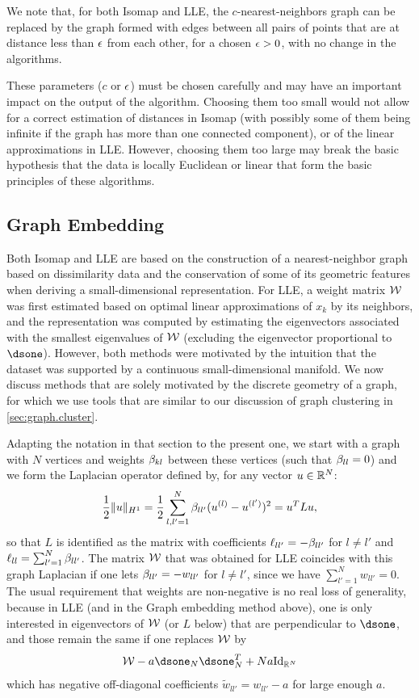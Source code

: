 \begin{remark}
We note that, for both Isomap and LLE, the $c$-nearest-neighbors graph can be replaced by the graph formed with edges between all pairs of points that are at distance less than $\epsilon$ from each other, for a chosen $\epsilon>0$, with no change in the algorithms.

These parameters ($c$ or $\epsilon$) must be chosen carefully and may have an important impact on the output of the algorithm. Choosing them too small would not allow for a correct estimation of distances in Isomap (with possibly some of them being infinite if the graph has more than one connected component), or of the linear approximations in LLE. However, choosing them too large
may break the basic hypothesis that the data is locally Euclidean or linear that form the basic principles of these algorithms.
\end{remark}


\subsection{Graph Embedding}

Both Isomap and LLE  are based on the construction of a nearest-neighbor graph based on dissimilarity data and the conservation of some of its geometric features when deriving a small-dimensional representation. For LLE, a weight matrix ${\mathcal W}$ was first estimated based on optimal linear approximations of $x_k$ by its neighbors, and the representation was computed by estimating the eigenvectors associated with the smallest eigenvalues of ${\mathcal W}$ (excluding the eigenvector proportional to $\dsone$). However, both methods were motivated by the intuition that the dataset was supported by a continuous small-dimensional manifold.
We now discuss methods that are solely motivated by the discrete geometry of a graph, for which we use tools that are similar to our discussion of graph clustering in \cref{sec:graph.cluster}. 

Adapting the notation in that section to the present one, we start with a graph with $N$ vertices and weights $\beta_{kl}$ between these vertices (such that $\beta_{ll}=0$) and we form the Laplacian operator defined by, for any vector $u\in {\mathbb{R}}^N$:
\[
\frac12 \|u\|_{H^1} = \frac12 \sum_{l,l'=1}^N \beta_{ll'} (u^{(l)} - u^{(l')})^2 = u^TLu, 
\]
so that $L$ is identified as the matrix with coefficients $\ell_{ll'} = - \beta_{ll'}$ for $l\neq l'$ and $\ell_{ll} = \sum_{l'=1}^N \beta_{ll'}$. The matrix ${\mathcal W}$ that was obtained for LLE coincides with this graph Laplacian if one lets $\beta_{ll'} = - w_{ll'}$ for $l\neq l'$, since we have $\sum_{l'=1}^N w_{ll'} = 0$. The usual requirement that weights are non-negative is no real loss of generality, because in LLE (and in the Graph embedding method above), one is only interested in eigenvectors of ${\mathcal W}$ (or $L$ below) that are perpendicular to $\dsone$, and those remain the same if one replaces ${\mathcal W}$ by
\[
\CW - a \dsone_N\dsone_N^T + Na \Id[N]
\]
which has negative off-diagonal coefficients $\tilde w_{ll'} = w_{ll'} - a$ for large enough $a$.
   


